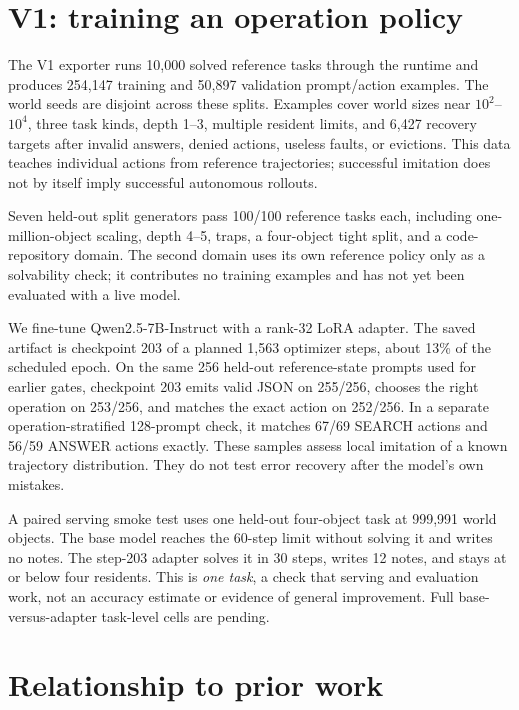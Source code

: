 \documentclass[10pt,letterpaper]{article}
\newcommand{\op}[1]{\textsf{#1}}
\begin{document}
\section{V1: training an operation policy}

The V1 exporter runs 10,000 solved reference tasks through the runtime and produces 254,147 training and 50,897 validation prompt/action examples. The world seeds are disjoint across these splits. Examples cover world sizes near $10^2$--$10^4$, three task kinds, depth 1--3, multiple resident limits, and 6,427 recovery targets after invalid answers, denied actions, useless faults, or evictions. This data teaches individual actions from reference trajectories; successful imitation does not by itself imply successful autonomous rollouts.

Seven held-out split generators pass 100/100 reference tasks each, including one-million-object scaling, depth 4--5, traps, a four-object tight split, and a code-repository domain. The second domain uses its own reference policy only as a solvability check; it contributes no training examples and has not yet been evaluated with a live model.

We fine-tune Qwen2.5-7B-Instruct with a rank-32 LoRA adapter. The saved artifact is checkpoint 203 of a planned 1,563 optimizer steps, about 13\% of the scheduled epoch. On the same 256 held-out reference-state prompts used for earlier gates, checkpoint 203 emits valid JSON on 255/256, chooses the right operation on 253/256, and matches the exact action on 252/256. In a separate operation-stratified 128-prompt check, it matches 67/69 \op{SEARCH} actions and 56/59 \op{ANSWER} actions exactly. These samples assess local imitation of a known trajectory distribution. They do not test error recovery after the model's own mistakes.

A paired serving smoke test uses one held-out four-object task at 999,991 world objects. The base model reaches the 60-step limit without solving it and writes no notes. The step-203 adapter solves it in 30 steps, writes 12 notes, and stays at or below four residents. This is \emph{one task}, a check that serving and evaluation work, not an accuracy estimate or evidence of general improvement. Full base-versus-adapter task-level cells are pending.

\section{Relationship to prior work}
\end{document}
